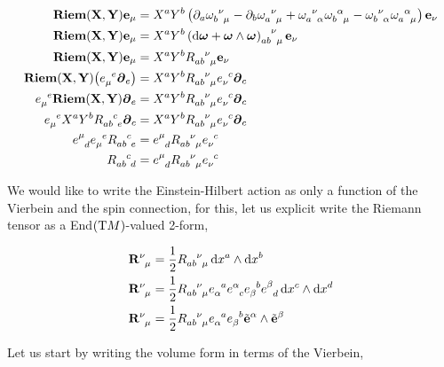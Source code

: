 \begin{align*}
    \textbf{Riem}\qty(\vb X,\vb Y)\vb e_\mu&=X^aY^b\left(\partial_{a}\tensor{\omega}{_b^\nu_\mu}-\partial_{b}\tensor{\omega}{_a^\nu_\mu}+\tensor{\omega}{_a^\nu_\alpha}\tensor{\omega}{_b^\alpha_\mu}-\tensor{\omega}{_b^\nu_\alpha}\tensor{\omega}{_a^\alpha_\mu}\right)\vb e_\nu\\
    \textbf{Riem}\qty(\vb X,\vb Y)\vb e_\mu&=X^aY^b\tensor{\left(\dd{\boldsymbol\omega}+\boldsymbol\omega\wedge\boldsymbol\omega\right)}{_a_b^\nu_\mu}\vb e_\nu\\
    \textbf{Riem}\qty(\vb X,\vb Y)\vb e_\mu&=X^aY^b\tensor{R}{_a_b^\nu_\mu}\vb e_\nu\\
    \textbf{Riem}\qty(\vb X,\vb Y)\qty(\tensor{e}{_\mu^e}\boldsymbol\partial_e)&=X^aY^b\tensor{R}{_a_b^\nu_\mu}\tensor{e}{_\nu^c}\boldsymbol\partial_c\\
    \tensor{e}{_\mu^e}\textbf{Riem}\qty(\vb X,\vb Y)\boldsymbol\partial_e&=X^aY^b\tensor{R}{_a_b^\nu_\mu}\tensor{e}{_\nu^c}\boldsymbol\partial_c\\
    \tensor{e}{_\mu^e}X^aY^b\tensor{R}{_a_b^c_e}\boldsymbol\partial_c&=X^aY^b\tensor{R}{_a_b^\nu_\mu}\tensor{e}{_\nu^c}\boldsymbol\partial_c\\
    \tensor{e}{^\mu_d}\tensor{e}{_\mu^e}\tensor{R}{_a_b^c_e}&=\tensor{e}{^\mu_d}\tensor{R}{_a_b^\nu_\mu}\tensor{e}{_\nu^c}\\
    \tensor{R}{_a_b^c_d}&=\tensor{e}{^\mu_d}\tensor{R}{_a_b^\nu_\mu}\tensor{e}{_\nu^c}
\end{align*}

We would like to write the Einstein-Hilbert action as only a function of the Vierbein and the spin connection, for this, let us explicit write the Riemann tensor as a End$\qty(\textnormal TM)$-valued 2-form,

\begin{align*}
    \tensor{{\vb R}}{^\nu_\mu}&=\frac12\tensor{R}{_a_b^\nu_\mu}\dd{x^a}\wedge\dd{x^b}\\
    \tensor{{\vb R}}{^\nu_\mu}&=\frac12\tensor{R}{_a_b^\nu_\mu}\tensor{e}{_\alpha^a}\tensor{e}{^\alpha_c}\tensor{e}{_\beta^b}\tensor{e}{^\beta_d}\dd{x^c}\wedge\dd{x^d}\\
    \tensor{{\vb R}}{^\nu_\mu}&=\frac12\tensor{R}{_a_b^\nu_\mu}\tensor{e}{_\alpha^a}\tensor{e}{_\beta^b}{\tilde{\vb e}^\alpha}\wedge{\tilde{\vb e}^\beta}
\end{align*}

Let us start by writing the volume form in terms of the Vierbein,

